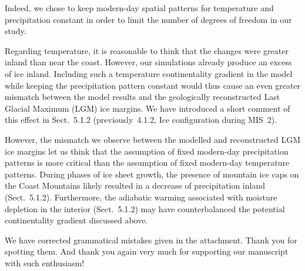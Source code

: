 Indeed, we chose to keep modern-day spatial patterns for temperature and
precipitation constant in order to limit the number of degrees of freedom in
our study.

Regarding temperature, it is reasonable to think that the changes were greater
inland than near the coast. However, our simulations already produce an
excess of ice inland. Including such a temperature continentality gradient
in the model while keeping the precipitation pattern constant would thus cause
an even greater mismatch between the model results and the geologically
reconstructed Last Glacial Maximum (LGM) ice margins. We have introduced a
short comment of this effect in Sect.~5.1.2 (previously~4.1.2, Ice
configuration during MIS~2).

However, the mismatch we observe between the modelled and reconstructed LGM ice
margins let us think that the assumption of fixed modern-day precipitation
patterns is more critical than the assumption of fixed modern-day temperature
patterns. During phases of ice sheet growth, the presence of mountain ice caps
on the Coast Mountains likely resulted in a decrease of precipitation inland
(Sect.~5.1.2). Furthermore, the adiabatic warming associated with moisture
depletion in the interior (Sect.~5.1.2) may have counterbalanced the potential
continentality gradient discussed above.


We have corrected grammatical mistakes given in the attachment. Thank you for
spotting them. And thank you again very much for supporting our manuscript with
such enthusiasm!


